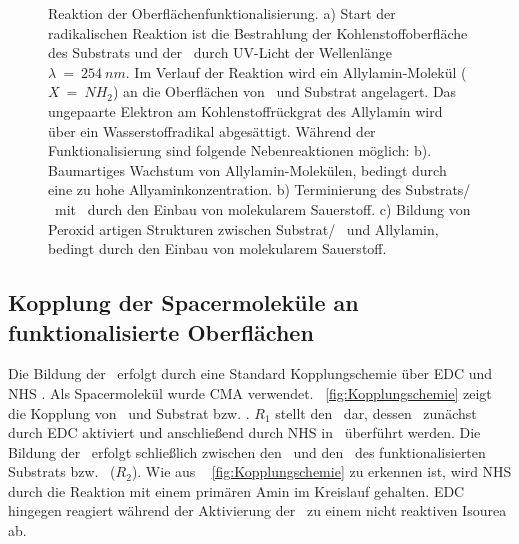 \begin{figure}[H]
	\caption{Reaktion der Oberflächenfunktionalisierung. a) Start der radikalischen Reaktion ist die Bestrahlung der Kohlenstoffoberfläche des Substrats und der \spitze~durch UV-Licht der Wellenlänge $\lambda~=~254~nm$. Im Verlauf der Reaktion wird ein Allylamin-Molekül ($X~=~NH_2$) an die Oberflächen von \spitze~und Substrat angelagert. Das ungepaarte Elektron am Kohlenstoffrückgrat des Allylamin wird über ein Wasserstoffradikal abgesättigt. Während der Funktionalisierung sind folgende Nebenreaktionen möglich: b). Baumartiges Wachstum von Allylamin-Molekülen, bedingt durch eine zu hohe Allyaminkonzentration. b) Terminierung des Substrats/ \spitze~mit \carboxys~durch den Einbau von molekularem Sauerstoff. c) Bildung von Peroxid artigen Strukturen zwischen Substrat/ \spitze~und Allylamin, bedingt durch den Einbau von molekularem Sauerstoff.}
	
	\label{fig:OF_Funktionalisierung}
\end{figure}

\subsection{Kopplung der Spacermoleküle an funktionalisierte Oberflächen}
\label{subsec:kopplung_der_spacermoleküle_an_funktionalisierte_oberfläche}

Die Bildung der \amid~erfolgt durch eine  Standard Kopplungschemie über \ac{EDC} und \ac{NHS} \cite{Hermanson.2013,MichaelF.Pill.2015}. Als Spacermolekül wurde \ac{CMA} verwendet. \abb~\ref{fig:Kopplungschemie} zeigt die Kopplung von \spacer~und Substrat bzw. \spitze. $R_1$ stellt den \spacer~dar, dessen \carboxys~zunächst durch \ac{EDC} aktiviert und anschließend durch \ac{NHS} in \ester~überführt werden. Die Bildung der \amid~erfolgt schließlich zwischen den \estern~und den \aminos~des funktionalisierten Substrats bzw. \spitze~($R_2$). Wie aus \abb~ \ref{fig:Kopplungschemie} zu erkennen ist, wird \ac{NHS} durch die Reaktion mit einem primären Amin im Kreislauf gehalten. \ac{EDC} hingegen reagiert während der Aktivierung der \carboxys~zu einem nicht reaktiven Isourea ab.

